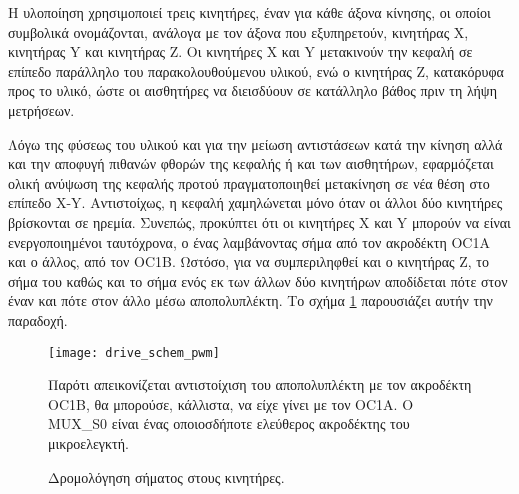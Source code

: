 Η υλοποίηση χρησιμοποιεί τρεις κινητήρες, έναν για κάθε άξονα κίνησης, οι οποίοι
συμβολικά ονομάζονται, ανάλογα με τον άξονα που εξυπηρετούν, κινητήρας X,
κινητήρας Y και κινητήρας Z. Οι κινητήρες X και Y μετακινούν την κεφαλή σε
επίπεδο παράλληλο του παρακολουθούμενου υλικού, ενώ ο κινητήρας Z, κατακόρυφα
προς το υλικό, ώστε οι αισθητήρες να διεισδύουν σε κατάλληλο βάθος πριν τη λήψη
μετρήσεων.

Λόγω της φύσεως του υλικού και για την μείωση αντιστάσεων κατά την κίνηση αλλά
και την αποφυγή πιθανών φθορών της κεφαλής ή και των αισθητήρων, εφαρμόζεται
ολική ανύψωση της κεφαλής προτού πραγματοποιηθεί μετακίνηση σε νέα θέση στο
επίπεδο X-Y. Αντιστοίχως, η κεφαλή χαμηλώνεται μόνο όταν οι άλλοι δύο κινητήρες
βρίσκονται σε ηρεμία. Συνεπώς, προκύπτει ότι οι κινητήρες X και Y μπορούν να
είναι ενεργοποιημένοι ταυτόχρονα, ο ένας λαμβάνοντας σήμα από τον ακροδέκτη OC1A
και ο άλλος, από τον OC1B. Ωστόσο, για να συμπεριληφθεί και ο κινητήρας Z, το
σήμα του καθώς και το σήμα ενός εκ των άλλων δύο κινητήρων αποδίδεται πότε στον
έναν και πότε στον άλλο μέσω αποπολυπλέκτη. Το σχήμα
\ref{fig:motor:route_pwm} παρουσιάζει αυτήν την παραδοχή.

\begin{figure}
    \caption{Δρομολόγηση σήματος στους κινητήρες.
    \label{fig:motor:route_pwm}}
    \begin{center}
    \texttt{[image: drive\_schem\_pwm]}
    \end{center}
Παρότι απεικονίζεται αντιστοίχιση του αποπολυπλέκτη με τον ακροδέκτη OC1B, θα
μπορούσε, κάλλιστα, να είχε γίνει με τον OC1A. Ο MUX\_S0 είναι ένας οποιοσδήποτε
ελεύθερος ακροδέκτης του μικροελεγκτή.
\end{figure}
